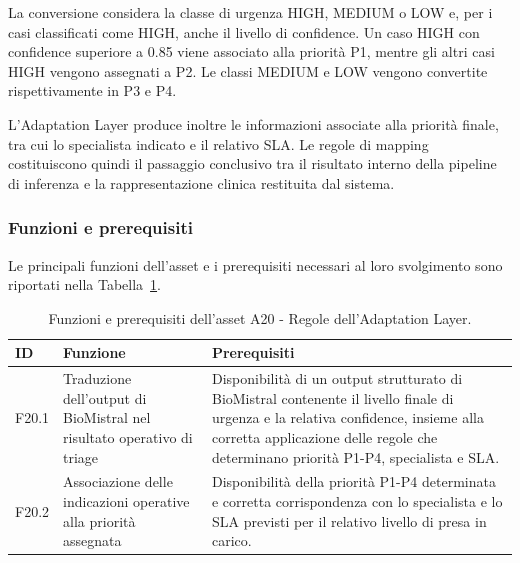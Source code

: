 La conversione considera la classe di urgenza HIGH, MEDIUM o LOW e, per i casi classificati come HIGH, anche il livello di confidence. Un caso HIGH con confidence superiore a 0.85 viene associato alla
priorità P1, mentre gli altri casi HIGH vengono assegnati a P2. Le classi MEDIUM e LOW vengono convertite rispettivamente in P3 e P4.

L'Adaptation Layer produce inoltre le informazioni associate alla priorità finale, tra cui lo specialista indicato e il relativo SLA. Le regole di mapping costituiscono quindi il passaggio conclusivo tra il risultato interno della pipeline di inferenza e la rappresentazione
clinica restituita dal sistema.

\subsubsection{Funzioni e prerequisiti}

Le principali funzioni dell'asset e i prerequisiti necessari al loro
svolgimento sono riportati nella Tabella~\ref{tab:a20-functions}.

\begin{table}[H]
    \centering
    \small
    \setlength{\tabcolsep}{4pt}
    \renewcommand{\arraystretch}{1.08}

    \begin{tabularx}{\textwidth}{
        >{\raggedright\arraybackslash}p{1.1cm}
        >{\raggedright\arraybackslash}p{3.8cm}
        X
    }
        \toprule

        \textbf{ID} &
        \textbf{Funzione} &
        \textbf{Prerequisiti} \\

        \midrule

        F20.1 &
        Traduzione dell'output di BioMistral nel risultato operativo di triage &
        Disponibilità di un output strutturato di BioMistral contenente il livello
        finale di urgenza e la relativa confidence, insieme alla corretta
        applicazione delle regole che determinano priorità P1-P4,
        specialista e SLA. \\

        \midrule

        F20.2 &
        Associazione delle indicazioni operative alla priorità assegnata &
        Disponibilità della priorità P1-P4 determinata e corretta
        corrispondenza con lo specialista e lo SLA previsti per il relativo
        livello di presa in carico. \\

        \bottomrule
    \end{tabularx}

    \caption{Funzioni e prerequisiti dell'asset A20 - Regole dell'Adaptation Layer.}
    \label{tab:a20-functions}
\end{table}

